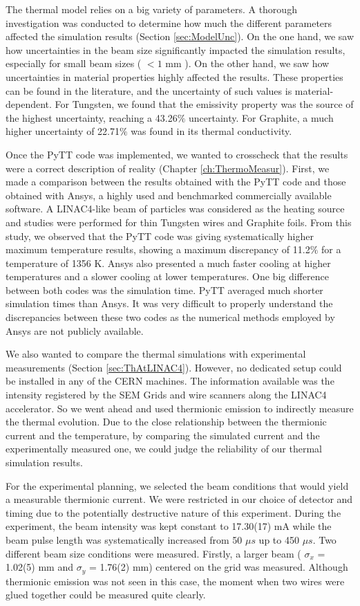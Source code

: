 The thermal model relies on a big variety of parameters. A thorough investigation was conducted to determine how much the different parameters affected the simulation results (Section \ref{sec:ModelUnc}). On the one hand, we saw how uncertainties in the beam size significantly impacted the simulation results, especially for small beam sizes ( $< 1$ mm ). On the other hand, we saw how uncertainties in material properties highly affected the results. These properties can be found in the literature, and the uncertainty of such values is material-dependent. For Tungsten, we found that the emissivity property was the source of the highest uncertainty, reaching a 43.26$\%$ uncertainty. For Graphite, a much higher uncertainty of 22.71$\%$ was found in its thermal conductivity. 

Once the PyTT code was implemented, we wanted to crosscheck that the results were a correct description of reality (Chapter \ref{ch:ThermoMeasur}). First, we made a comparison between the results obtained with the PyTT code and those obtained with Ansys, a highly used and benchmarked commercially available software. A LINAC4-like beam of particles was considered as the heating source and studies were performed for thin Tungsten wires and Graphite foils. From this study, we observed that the PyTT code was giving systematically higher maximum temperature results, showing a maximum discrepancy of 11.2$\%$ for a temperature of 1356 K. Ansys also presented a much faster cooling at higher temperatures and a slower cooling at lower temperatures. One big difference between both codes was the simulation time. PyTT averaged much shorter simulation times than Ansys. It was very difficult to properly understand the discrepancies between these two codes as the numerical methods employed by Ansys are not publicly available.

We also wanted to compare the thermal simulations with experimental measurements (Section \ref{sec:ThAtLINAC4}). However, no dedicated setup could be installed in any of the CERN machines. The information available was the intensity registered by the SEM Grids and wire scanners along the LINAC4 accelerator. So we went ahead and used thermionic emission to indirectly measure the thermal evolution. Due to the close relationship between the thermionic current and the temperature, by comparing the simulated current and the experimentally measured one, we could judge the reliability of our thermal simulation results. 

For the experimental planning, we selected the beam conditions that would yield a measurable thermionic current. We were restricted in our choice of detector and timing due to the potentially destructive nature of this experiment. During the experiment, the beam intensity was kept constant to 17.30(17) mA while the beam pulse length was systematically increased from 50 $\mu s$ up to 450 $\mu s$. Two different beam size conditions were measured. Firstly, a larger beam ( $\sigma_x $ = 1.02(5) mm and $\sigma_y$ = 1.76(2) mm) centered on the grid was measured. Although thermionic emission was not seen in this case, the moment when two wires were glued together could be measured quite clearly. 

